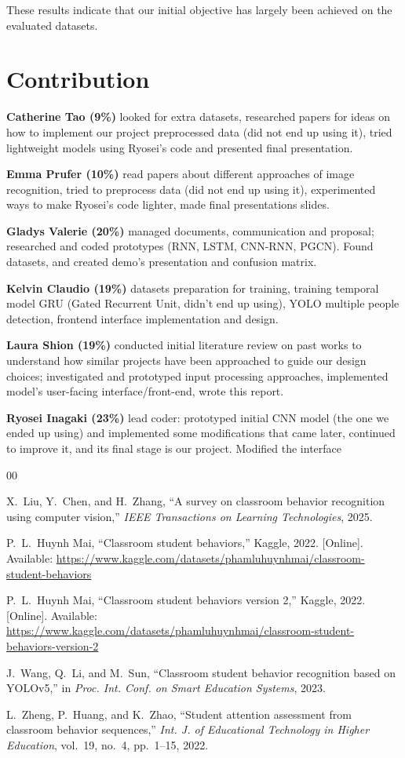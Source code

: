 \documentclass[conference]{IEEEtran}
\begin{document}
These results indicate that our initial objective has largely been achieved on the evaluated datasets.

\section{Contribution}
\textbf{Catherine Tao (9\%)} looked for extra datasets, researched papers for ideas on how to implement our project  preprocessed data (did not end up using it), tried lightweight models using Ryosei’s code and presented final presentation.

\textbf{Emma Prufer (10\%)} read papers about different approaches of image recognition, tried to preprocess data (did not end up using it), experimented ways to make Ryosei’s code lighter, made final presentations slides.

\textbf{Gladys Valerie (20\%)} managed documents, communication and proposal; researched and coded prototypes (RNN, LSTM, CNN-RNN, PGCN). Found datasets, and created demo’s presentation and confusion matrix.

\textbf{Kelvin Claudio (19\%)} datasets preparation for training, training temporal model GRU (Gated Recurrent Unit, didn’t end up using), YOLO multiple people detection, frontend interface implementation and design.

\textbf{Laura Shion (19\%)} conducted initial literature review on past works to understand how similar projects have been approached to guide our design choices; investigated and prototyped input processing approaches, implemented model's user-facing interface/front-end, wrote this report.

\textbf{Ryosei Inagaki (23\%)} lead coder: prototyped initial CNN model (the one we ended up using) and implemented some modifications that came later, continued to improve it, and its final stage is our project. Modified the interface

\begin{thebibliography}{00}

X.~Liu, Y.~Chen, and H.~Zhang, ``A survey on classroom behavior recognition using computer vision,'' 
\emph{IEEE Transactions on Learning Technologies}, 2025.

P.~L.~Huynh Mai, ``Classroom student behaviors,'' Kaggle, 2022. [Online].
Available: \url{https://www.kaggle.com/datasets/phamluhuynhmai/classroom-student-behaviors}

P.~L.~Huynh Mai, ``Classroom student behaviors version 2,'' Kaggle, 2022. [Online].
Available: \url{https://www.kaggle.com/datasets/phamluhuynhmai/classroom-student-behaviors-version-2}

J.~Wang, Q.~Li, and M.~Sun, ``Classroom student behavior recognition based on {YOLOv5},'' 
in \emph{Proc. Int. Conf. on Smart Education Systems}, 2023.

L.~Zheng, P.~Huang, and K.~Zhao, ``Student attention assessment from classroom behavior sequences,'' 
\emph{Int. J. of Educational Technology in Higher Education}, vol.~19, no.~4, pp.~1--15, 2022.

\end{thebibliography}
\end{document}
